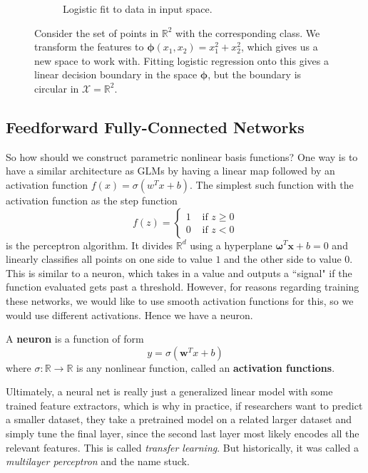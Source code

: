 \begin{figure}[H]
\begin{subfigure}[t]{0.24\textwidth}
      \caption{Logistic fit to data in input space.}
      \label{fig:raw_trained}
    \end{subfigure}
    \caption{Consider the set of points in $\mathbb{R}^2$ with the corresponding class. We transform the features to $\boldsymbol{\phi}(x_1, x_2) = x_1^2 + x_2^2$, which gives us a new space to work with. Fitting logistic regression onto this gives a linear decision boundary in the space $\boldsymbol{\phi}$, but the boundary is circular in $\mathcal{X} = \mathbb{R}^2$.}
    \label{fig:logistic_transformed}
  \end{figure}

\subsection{Feedforward Fully-Connected Networks}

  So how should we construct parametric nonlinear basis functions? One way is to have a similar architecture as GLMs by having a linear map followed by an activation function $f(x) = \sigma(w^T x + b)$. The simplest such function with the activation function as the step function 
  \begin{equation}
    f(z) = \begin{cases} 1 & \text{ if } z \geq 0 \\ 0 & \text{ if } z < 0 \end{cases}
  \end{equation}
  is the perceptron algorithm. It divides $\mathbb{R}^d$ using a hyperplane $\boldsymbol{\omega}^T \mathbf{x} + b = 0$ and linearly classifies all points on one side to value $1$ and the other side to value $0$. This is similar to a neuron, which takes in a value and outputs a ``signal" if the function evaluated gets past a threshold. However, for reasons regarding training these networks, we would like to use smooth activation functions for this, so we would use different activations. Hence we have a neuron. 

  \begin{definition}[Neuron]
    A \textbf{neuron} is a function of form 
    \begin{equation}
      y = \sigma(\mathbf{w}^T x  + b)
    \end{equation}
    where $\sigma: \mathbb{R} \rightarrow \mathbb{R}$ is any nonlinear function, called an \textbf{activation functions}. 
  \end{definition}
  
  Ultimately, a neural net is really just a generalized linear model with some trained feature extractors, which is why in practice, if researchers want to predict a smaller dataset, they take a pretrained model on a related larger dataset and simply tune the final layer, since the second last layer most likely encodes all the relevant features. This is called \textit{transfer learning}. But historically, it was called a \textit{multilayer perceptron} and the name stuck. 

